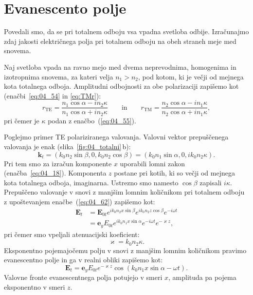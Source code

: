 \section{Evanescento polje}
Povedali smo, da se pri totalnem odboju vsa vpadna svetloba odbije. Izračunajmo
zdaj jakosti električnega polja pri totalnem odboju na obeh straneh meje med snovema.

Naj svetloba vpada na ravno mejo med dvema neprevodnima, homogenima 
in izotropnima snovema, za kateri velja $n_1>n_2$, pod kotom, ki je večji od mejnega
kota totalnega odboja. Amplitudni odbojnosti 
za obe polarizaciji zapišemo kot (enačbi~\ref{eq:04_54} in 
\ref{eq:TMr}):
\begin{equation}
r_{\mathrm{TE}} = \frac{n_1 \cos \alpha - i n_2 \kappa}
{n_1 \cos \alpha + i n_2 \kappa} \qquad \mathrm{in} \qquad
r_{\mathrm{TM}} = \frac{n_2 \cos \alpha - i n_1 \kappa}
{n_2 \cos \alpha + i n_1 \kappa},
\label{eq:04_61}
\end{equation}
pri čemer je $\kappa$ podan z enačbo~(\ref{eq:04_55}).

Poglejmo primer TE polariziranega valovanja. Valovni
vektor prepuščenega valovanja je enak (slika~\ref{fig:04_totalni}\,b):
\begin{equation}
\mathbf{k}_t = \left( k_0 n_2 \sin \beta, 0, k_0 n_2 \cos \beta \right) = 
\left( k_0 n_1 \sin \alpha, 0, i k_0 n_2 \kappa \right)\!.
\label{eq:04_62}
\end{equation}
Pri tem smo za izračun komponente $x$ uporabili lomni zakon (enačba~\ref{eq:04_18}). 
Komponenta $z$ postane pri kotih, ki so večji od mejnega kota totalnega odboja, imaginarna. 
Ustrezno smo namesto $\cos \beta$ zapisali $i\kappa$. 
Prepuščeno valovanje v snovi z manjšim lomnim količnikom 
pri totalnem odboju z upoštevanjem enačbe~(\ref{eq:04_62}) zapišemo kot:
\begin{align}
\mathbf{E}_t &= \mathbf{E}_{0t} e^{i k_0 n_2 x \sin \beta }
 e^{i k_0 n_2 z\cos \beta} e^{-i \omega t} \nonumber\\
 &= \mathbf{e}_{y} E_{0t}  e^{i k_0 n_1 x\sin \alpha}
 e^{-i \omega t} e^{- \varkappa z},
 \label{eq:04_63}
\end{align}
pri čemer smo vpeljali atenuacijski koeficient:
\begin{equation}
\varkappa = k_0 n_2 \kappa.
\label{eq:kappatot}
\end{equation}
Eksponentno pojemajočemu polju v snovi z manjšim 
lomnim količnikom pravimo evanescentno polje 
in ga v realni obliki zapišemo kot:
\begin{equation}
\mathbf{E}_t = \mathbf{e}_{y} E_{0t} e^{- \varkappa z}
\cos \left( k_0 n_1 x\sin \alpha -\omega t\right)\!. 
\label{eq:04_64}
\end{equation}
Valovne fronte evanescentnega polja potujejo v smeri $x$, 
amplituda pa pojema eksponentno v smeri $z$. 

